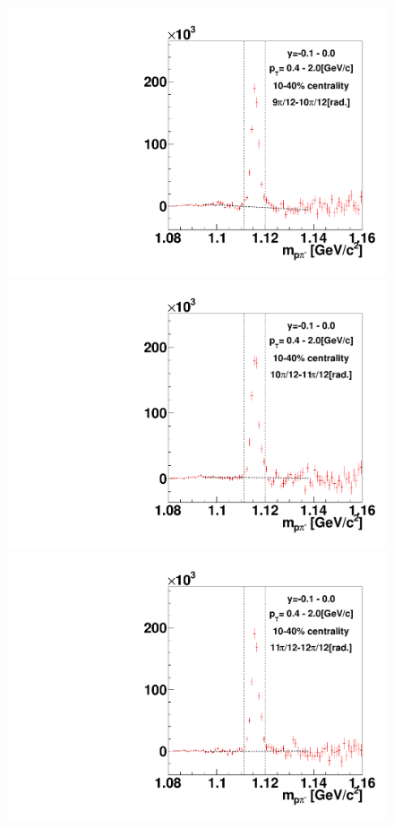 \begin{figure}[h]
\includegraphics[width=0.14\linewidth]{chapterX/fig/ld_v1_sig/kf_ptslice0_cent1_ld_flow_phi10_rap5.pdf}
\includegraphics[width=0.14\linewidth]{chapterX/fig/ld_v1_sig/kf_ptslice0_cent1_ld_flow_phi11_rap5.pdf}
\includegraphics[width=0.14\linewidth]{chapterX/fig/ld_v1_sig/kf_ptslice0_cent1_ld_flow_phi12_rap5.pdf}


\end{figure}
